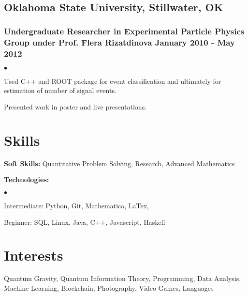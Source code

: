 \documentclass[letterpaper]{article}
\renewenvironment{itemize}{
  \begin{list}{$\bullet$}{
    \setlength{\itemsep}{0em}
    \setlength{\parskip}{0em}
    \setlength{\parsep}{0em} 
    \setlength{\topsep}{0em} 
  }
}{
  \end{list}
}
\begin{document}
\subsection*{Oklahoma State University, Stillwater, OK}
\subsubsection*{Undergraduate Researcher in Experimental Particle Physics Group under Prof. Flera Rizatdinova \hfill January 2010 - May 2012}
    \begin{itemize}
        \item Used C++ and ROOT package for event classification and ultimately for estimation of number of signal events.
        \item Presented work in poster and live presentations.
    \end{itemize}
    

\section*{Skills}

{\bf Soft Skills:} Quantitative Problem Solving, Research, Advanced Mathematics

{\bf Technologies:}
\begin{itemize}
	\item[] Intermediate: Python, Git, Mathematica, LaTex, 
	\item[] Beginner: SQL, Linux, Java, C++, Javascript, Haskell
\end{itemize}
 


\section*{Interests}

Quantum Gravity, Quantum Information Theory, Programming, Data Analysis, Machine Learning, Blockchain, Photography, Video Games, Languages
\end{document}
